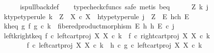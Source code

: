 \begin{isabellebody}
\ \ \ \ \isamarkupfalse%
\ is{\isacharunderscore}{\kern0pt}pullback{\isacharunderscore}{\kern0pt}def\isanewline
\ \ \isamarkupfalse%
\ {\isacharparenleft}{\kern0pt}typecheck{\isacharunderscore}{\kern0pt}cfuncs{\isacharcomma}{\kern0pt}\ safe{\isacharcomma}{\kern0pt}\ metis\ b{\isacharunderscore}{\kern0pt}eq{\isacharparenright}{\kern0pt}\isanewline
\ \ \ \ \isamarkupfalse%
\ Z\ k\ j\isanewline
\ \ \ \ \isamarkupfalse%
\ k{\isacharunderscore}{\kern0pt}type{\isacharbrackleft}{\kern0pt}type{\isacharunderscore}{\kern0pt}rule{\isacharbrackright}{\kern0pt}{\isacharcolon}{\kern0pt}\ {\isachardoublequoteopen}k\ {\isacharcolon}{\kern0pt}\ Z\ {\isasymrightarrow}\ X\ {\isasymtimes}\isactrlsub c\ X{\isachardoublequoteclose}\ \ h{\isacharunderscore}{\kern0pt}type{\isacharbrackleft}{\kern0pt}type{\isacharunderscore}{\kern0pt}rule{\isacharbrackright}{\kern0pt}{\isacharcolon}{\kern0pt}\ {\isachardoublequoteopen}j\ {\isacharcolon}{\kern0pt}\ Z\ {\isasymrightarrow}\ E\ \isactrlbsub h\isactrlesub {\isasymtimes}\isactrlsub c\isactrlbsub h\isactrlesub \ E{\isachardoublequoteclose}\isanewline
\ \ \ \ \isamarkupfalse%
\ k{\isacharunderscore}{\kern0pt}h{\isacharunderscore}{\kern0pt}eq{\isacharcolon}{\kern0pt}\ {\isachardoublequoteopen}{\isacharparenleft}{\kern0pt}g\ {\isasymtimes}\isactrlsub f\ g{\isacharparenright}{\kern0pt}\ {\isasymcirc}\isactrlsub c\ k\ {\isacharequal}{\kern0pt}\ fibered{\isacharunderscore}{\kern0pt}product{\isacharunderscore}{\kern0pt}morphism\ E\ h\ h\ E\ {\isasymcirc}\isactrlsub c\ j{\isachardoublequoteclose}\isanewline
\isanewline
\ \ \ \ \isamarkupfalse%
\ left{\isacharunderscore}{\kern0pt}k{\isacharunderscore}{\kern0pt}right{\isacharunderscore}{\kern0pt}k{\isacharunderscore}{\kern0pt}eq{\isacharcolon}{\kern0pt}\ {\isachardoublequoteopen}f\ {\isasymcirc}\isactrlsub c\ left{\isacharunderscore}{\kern0pt}cart{\isacharunderscore}{\kern0pt}proj\ X\ X\ {\isasymcirc}\isactrlsub c\ k\ {\isacharequal}{\kern0pt}\ f\ {\isasymcirc}\isactrlsub c\ right{\isacharunderscore}{\kern0pt}cart{\isacharunderscore}{\kern0pt}proj\ X\ X\ {\isasymcirc}\isactrlsub c\ k{\isachardoublequoteclose}\isanewline
\ \ \ \ \isamarkupfalse%
\ {\isacharminus}{\kern0pt}\isanewline
\ \ \ \ \ \ \isamarkupfalse%
\ {\isachardoublequoteopen}f\ {\isasymcirc}\isactrlsub c\ left{\isacharunderscore}{\kern0pt}cart{\isacharunderscore}{\kern0pt}proj\ X\ X\ {\isasymcirc}\isactrlsub c\ k\ {\isacharequal}{\kern0pt}\ h\ {\isasymcirc}\isactrlsub c\ g\ {\isasymcirc}\isactrlsub c\ left{\isacharunderscore}{\kern0pt}cart{\isacharunderscore}{\kern0pt}proj\ X\ X\ {\isasymcirc}\isactrlsub c\ k{\isachardoublequoteclose}\isanewline

\end{isabellebody}
